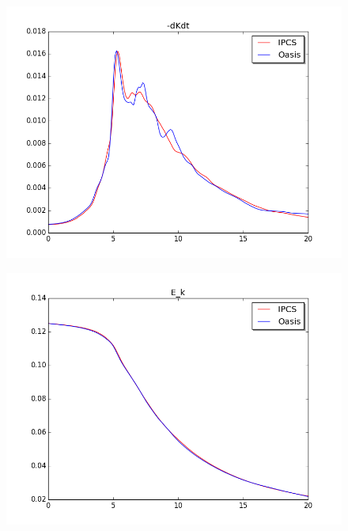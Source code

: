 \begin{center}
\begin{figure}[h!]
\centering
\begin{minipage}{.5\textwidth}
  \centering
  \includegraphics[scale=0.4]{./Verification_Validation/TaylorGreen/Dkdt.png}
  \label{fig:test1}
\end{minipage}%
\begin{minipage}{.5\textwidth}
  \centering
  \includegraphics[scale=0.4]{./Verification_Validation/TaylorGreen/Ek.png}
  \label{fig:test2}
\end{minipage}
\end{figure}
\end{center}
































